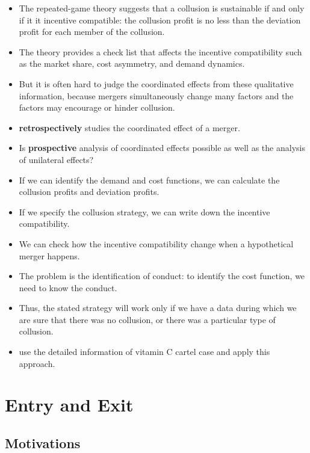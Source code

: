 \documentclass[]{book}
\providecommand{\tightlist}{%
  \setlength{\itemsep}{0pt}\setlength{\parskip}{0pt}}
\begin{document}
\begin{itemize}
\tightlist
\item
  The repeated-game theory suggests that a collusion is sustainable if
  and only if it it incentive compatible: the collusion profit is no
  less than the deviation profit for each member of the collusion.
\item
  The theory provides a check list that affects the incentive
  compatibility such as the market share, cost asymmetry, and demand
  dynamics.
\item
  But it is often hard to judge the coordinated effects from these
  qualitative information, because mergers simultaneously change many
  factors and the factors may encourage or hinder collusion.
\item
  \citet{Miller2017} \textbf{retrospectively} studies the coordinated
  effect of a merger.
\item
  Is \textbf{prospective} analysis of coordinated effects possible as
  well as the analysis of unilateral effects?
\item
  If we can identify the demand and cost functions, we can calculate the
  collusion profits and deviation profits.
\item
  If we specify the collusion strategy, we can write down the incentive
  compatibility.
\item
  We can check how the incentive compatibility change when a
  hypothetical merger happens.
\item
  The problem is the identification of conduct: to identify the cost
  function, we need to know the conduct.
\item
  Thus, the stated strategy will work only if we have a data during
  which we are sure that there was no collusion, or there was a
  particular type of collusion.
\item
  \citet{Igami2018} use the detailed information of vitamin C cartel
  case and apply this approach.
\end{itemize}

\chapter{Entry and Exit}\label{entryexit}

\section{Motivations}\label{motivations-3}
\end{document}
